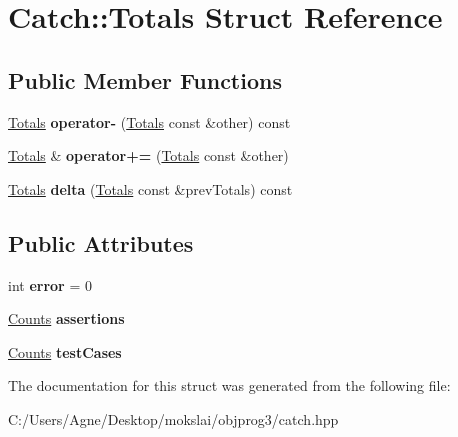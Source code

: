 \hypertarget{struct_catch_1_1_totals}{}\section{Catch\+:\+:Totals Struct Reference}
\label{struct_catch_1_1_totals}
\subsection*{Public Member Functions}
\begin{DoxyCompactItemize}
\item 
\mbox{\label{struct_catch_1_1_totals_a9279ed39139cb7e7b291918a6d08290e}} 
\mbox{\hyperlink{struct_catch_1_1_totals}{Totals}} {\bfseries operator-\/} (\mbox{\hyperlink{struct_catch_1_1_totals}{Totals}} const \&other) const
\item 
\mbox{\label{struct_catch_1_1_totals_a574015076e54cc405c70b053e3356e43}} 
\mbox{\hyperlink{struct_catch_1_1_totals}{Totals}} \& {\bfseries operator+=} (\mbox{\hyperlink{struct_catch_1_1_totals}{Totals}} const \&other)
\item 
\mbox{\label{struct_catch_1_1_totals_a1a94a654f5f3786b75695e081fc9bca2}} 
\mbox{\hyperlink{struct_catch_1_1_totals}{Totals}} {\bfseries delta} (\mbox{\hyperlink{struct_catch_1_1_totals}{Totals}} const \&prev\+Totals) const
\end{DoxyCompactItemize}
\subsection*{Public Attributes}
\begin{DoxyCompactItemize}
\item 
\mbox{\label{struct_catch_1_1_totals_a6ea14c7de7ea735a14f172a26e08a239}} 
int {\bfseries error} = 0
\item 
\mbox{\label{struct_catch_1_1_totals_a885ded66df752147b30c3d45aa602ec9}} 
\mbox{\hyperlink{struct_catch_1_1_counts}{Counts}} {\bfseries assertions}
\item 
\mbox{\label{struct_catch_1_1_totals_adb195fe477aedee2ecea88c888f16506}} 
\mbox{\hyperlink{struct_catch_1_1_counts}{Counts}} {\bfseries test\+Cases}
\end{DoxyCompactItemize}


The documentation for this struct was generated from the following file\+:\begin{DoxyCompactItemize}
\item 
C\+:/\+Users/\+Agne/\+Desktop/mokslai/objprog3/catch.\+hpp\end{DoxyCompactItemize}
